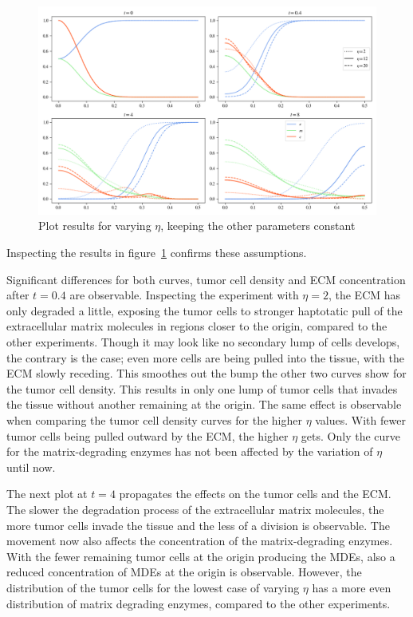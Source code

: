 \begin{figure}[h!]
 \centering
 \includegraphics[width=\textwidth]{resources/images/eta_variation.png}
 \caption{Plot results for varying $\eta$, keeping the other parameters constant}
 \label{fig:eta_variation}
\end{figure}
Inspecting the results in figure~\ref{fig:eta_variation} confirms these assumptions.

Significant differences for both curves, tumor cell density and ECM concentration after $t=0.4$ are observable. Inspecting the experiment with $\eta=2$, the ECM has only degraded a little, exposing the tumor cells to stronger haptotatic pull of the extracellular matrix molecules in regions closer to the origin, compared to the other experiments. Though it may look like no secondary lump of cells develops, the contrary is the case; even more cells are being pulled into the tissue, with the ECM slowly receding. This smoothes out the bump the other two curves show for the tumor cell density. This results in only one lump of tumor cells that invades the tissue without another remaining at the origin. The same effect is observable when comparing the tumor cell density curves for the higher $\eta$ values. With fewer tumor cells being pulled outward by the ECM, the higher $\eta$ gets. Only the curve for the matrix-degrading enzymes has not been affected by the variation of $\eta$ until now.

The next plot at $t=4$ propagates the effects on the tumor cells and the ECM. The slower the degradation process of the extracellular matrix molecules, the more tumor cells invade the tissue and the less of a division is observable. The movement now also affects the concentration of the matrix-degrading enzymes. With the fewer remaining tumor cells at the origin producing the MDEs, also a reduced concentration of MDEs at the origin is observable. However, the distribution of the tumor cells for the lowest case of varying $\eta$ has a more even distribution of matrix degrading enzymes, compared to the other experiments.

